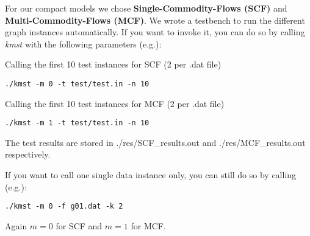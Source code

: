 \documentclass{article}
\begin{document}
\sloppy


\clearpage

For our compact models we chose \textbf{Single-Commodity-Flows (SCF)} and \textbf{Multi-Commodity-Flows (MCF)}. We wrote a testbench to run the different graph instances automatically. If you want to invoke it, you can do so by calling \textit{kmst} with the following parameters (e.g.):

\hspace{0.5cm}

Calling the first 10 test instances for SCF (2 per .dat file)
\begin{lstlisting}
./kmst -m 0 -t test/test.in -n 10 
\end{lstlisting}

Calling the first 10 test instances for MCF (2 per .dat file)
\begin{lstlisting}
./kmst -m 1 -t test/test.in -n 10 
\end{lstlisting}

The test results are stored in ./res/SCF\_results.out and ./res/MCF\_results.out respectively.

If you want to call one single data instance only, you can still do so by calling (e.g.):
\begin{lstlisting}
./kmst -m 0 -f g01.dat -k 2 
\end{lstlisting}

Again $m = 0$ for SCF and $m = 1$ for MCF. 






\clearpage
\end{document}
